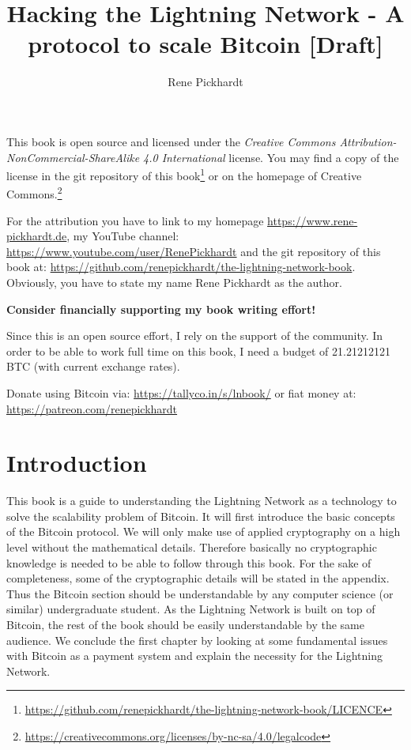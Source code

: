 \documentclass[a4paper,12pt,oneside,openany]{book}
\title{Hacking the Lightning Network - A protocol to scale Bitcoin [Draft]}
\author{Rene Pickhardt}
\begin{document}
\maketitle

\newpage
This book is open source and licensed under the \textit{Creative Commons Attribution-NonCommercial-ShareAlike 4.0 International} license. You may find a copy of the license in the git repository of this book\footnote{\url{https://github.com/renepickhardt/the-lightning-network-book/LICENCE}} or on the homepage of Creative Commons.\footnote{\url{https://creativecommons.org/licenses/by-nc-sa/4.0/legalcode}}

For the attribution you have to link to my homepage \url{https://www.rene-pickhardt.de}, my YouTube channel: \url{https://www.youtube.com/user/RenePickhardt} and the git repository of this book at: \url{https://github.com/renepickhardt/the-lightning-network-book}. Obviously, you have to state my name Rene Pickhardt as the author.

\textbf{Consider financially supporting my book writing effort!}

Since this is an open source effort, I rely on the support of the community. In order to be able to work full time on this book, I need a budget of 21.21212121 BTC (with current exchange rates).

Donate using Bitcoin via: \url{https://tallyco.in/s/lnbook/} or fiat money at:  \url{https://patreon.com/renepickhardt}

\newpage
\tableofcontents
\newpage

\newcommand{\problem}[1]{\textbf{Problem: #1}}
\newcommand{\todo}[1]{\textcolor{blue}{\textbf{TODO}: #1}}

\newtheorem{theorem}{Theorem}[chapter]
\newtheorem{lemma}{Lemma}[chapter]
\theoremstyle{remark}
\newtheorem{remark}{Remark}[chapter]
\theoremstyle{definition}
\newtheorem{definition}{Definition}[chapter]
\theoremstyle{remark}
\newtheorem{example}{Example}[chapter]

\chapter{Introduction}
This book is a guide to understanding the Lightning Network as a technology to solve the scalability problem of Bitcoin.
It will first introduce the basic concepts of the Bitcoin protocol.
We will only make use of applied cryptography on a high level without the mathematical details.
Therefore basically no cryptographic knowledge is needed to be able to follow through this book.
For the sake of completeness, some of the cryptographic details will be stated in the appendix.
Thus the Bitcoin section should be understandable by any computer science (or similar) undergraduate student.
As the Lightning Network is built on top of Bitcoin, the rest of the book should be easily understandable by the same audience.
We conclude the first chapter by looking at some fundamental issues with Bitcoin as a payment system and explain the necessity for the Lightning Network.
\end{document}
